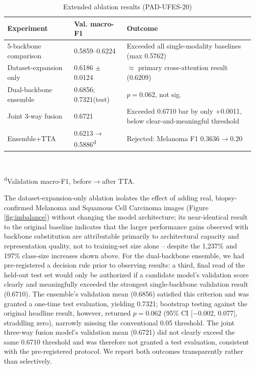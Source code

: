 \documentclass[conference]{IEEEtran}
\begin{document}
\begin{table}[t]
\caption{Extended ablation results (PAD-UFES-20)}
\label{tab:ablations}
\centering
\scriptsize
\begin{tabular}{|p{2.6cm}|p{1.9cm}|p{2.1cm}|}
\hline
\textbf{Experiment} & \textbf{Val. macro-F1} & \textbf{Outcome} \\
\hline
5-backbone comparison & 0.5859--0.6224 & Exceeded all single-modality baselines (max 0.5762) \\
\hline
Dataset-expansion only & 0.6186 $\pm$ 0.0124 & $\approx$ primary cross-attention result (0.6209) \\
\hline
Dual-backbone ensemble & 0.6856; 0.7321(test) & $p=0.062$, not sig. \\
\hline
Joint 3-way fusion & 0.6721 & Exceeded 0.6710 bar by only +0.0011, below clear-and-meaningful threshold \\
\hline
Ensemble+TTA & 0.6213$\to$0.5886\textsuperscript{d} & Rejected: Melanoma F1 0.3636$\to$0.20 \\
\hline
\end{tabular}
\\[2pt]
\raggedright{\scriptsize \textsuperscript{d}Validation macro-F1, before$\to$after TTA.}
\end{table}

The dataset-expansion-only ablation isolates the effect of adding real, biopsy-confirmed Melanoma and Squamous Cell Carcinoma images (Figure \ref{fig:imbalance}) without changing the model architecture; its near-identical result to the original baseline indicates that the larger performance gains observed with backbone substitution are attributable primarily to architectural capacity and representation quality, not to training-set size alone -- despite the 1,237\% and 197\% class-size increases shown above. For the dual-backbone ensemble, we had pre-registered a decision rule prior to observing results: a third, final read of the held-out test set would only be authorized if a candidate model's validation score clearly and meaningfully exceeded the strongest single-backbone validation result (0.6710). The ensemble's validation mean (0.6856) satisfied this criterion and was granted a one-time test evaluation, yielding 0.7321; bootstrap testing against the original headline result, however, returned $p=0.062$ (95\% CI [$-$0.002, 0.077], straddling zero), narrowly missing the conventional 0.05 threshold. The joint three-way fusion model's validation mean (0.6721) did not clearly exceed the same 0.6710 threshold and was therefore not granted a test evaluation, consistent with the pre-registered protocol. We report both outcomes transparently rather than selectively.
\end{document}
